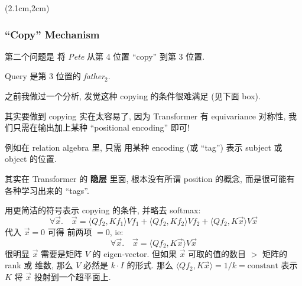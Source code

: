 \begin{preview}
\begin{minipage}{\textwidth}
	
\setlength{\parskip}{0.4\baselineskip}
\begin{textblock*}{20cm}(2.1cm,2cm) %
	{}
	\hspace{8cm}
\end{textblock*}

\vspace*{0.3cm} 

\subsubsection{``Copy'' Mechanism}

第二个问题是 将 \textit{Pete} 从第 4 位置 ``copy'' 到第 3 位置.

Query 是第 3 位置的 \textit{father}$_2$.

之前我做过一个分析, 发觉这种 copying 的条件很难满足 (见下面 box).

其实要做到 copying 实在太容易了, 因为 Transformer 有 equivariance 对称性, 我们只需在输出加上某种 ``positional encoding'' 即可!

例如在 relation algebra 里, 只需 用某种 encoding (或 ``tag'') 表示 subject 或 object 的位置.

其实在 Transformer 的 \textbf{隐层} 里面, 根本没有所谓 position 的概念, 而是很可能有各种学习出来的 ``tags''.

\begin{tcolorbox}[breakable, parbox=false, fonttitle=\bfseries, title={位置 Copy 机制的分析}]

用更简洁的符号表示 copying 的条件, 并略去 softmax:
\begin{equation}
\forall \vec{x}. \quad \vec{x} = \langle Q f_2, K f_1 \rangle V f_1 + \langle Q f_2, K f_2 \rangle V f_2 + \langle Q f_2, K \vec{x} \rangle V \vec{x}
\label{eqn:copy-condition}
\end{equation}
代入 $\vec{x} = 0$ 可得 前两项 $= 0$, ie:
\begin{equation}
\forall \vec{x}. \quad \vec{x} = \langle Q f_2, K \vec{x} \rangle V \vec{x}
\end{equation}
很明显 $\vec{x}$ 需要是矩阵 $V$ 的 eigen-vector.  但如果 $\vec{x}$ 可取的值的数目 $>$ 矩阵的 rank 或 维数, 那么 $V$ 必然是 $k \cdot I$ 的形式.  那么 $\langle Q f_2, K \vec{x} \rangle = 1/k = \mbox{constant}$ 表示 $K$ 将 $\vec{x}$ 投射到一个超平面上.


\end{tcolorbox}
\end{minipage}
\end{preview}
